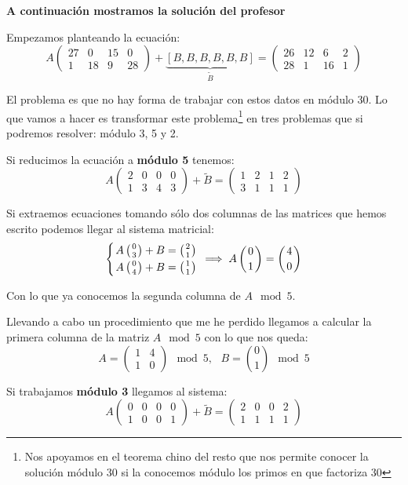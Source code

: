 \begin{problem}[6]
\textbf{A continuación mostramos la solución del profesor}

Empezamos planteando la ecuación:
\[A \left( \begin{array}{cccc}
		27 & 0 & 15 & 0\\
		1 & 18 & 9 & 28
	\end{array} \right) + \underbrace{[B,B,B,B,B,B]}_{\tilde{B}} = \left( \begin{array}{cccc}
		26 & 12 & 6 & 2\\
		28 & 1 & 16 & 1
	\end{array} \right)\]

El problema es que no hay forma de trabajar con estos datos en módulo 30. Lo que vamos a hacer es transformar este problema\footnote{Nos apoyamos en el teorema chino del resto que nos permite conocer la solución módulo 30 si la conocemos módulo los primos en que factoriza 30} en tres problemas que si podremos resolver: módulo 3, 5 y 2.

Si reducimos la ecuación a \textbf{módulo 5} tenemos:
\[A \left( \begin{array}{cccc}
		2 & 0 & 0 & 0\\
		1 & 3 & 4 & 3
	\end{array} \right) + \tilde{B} = \left( \begin{array}{cccc}
		1 & 2 & 1 & 2\\
		3 & 1 & 1 & 1
	\end{array} \right)\]


Si extraemos ecuaciones tomando sólo dos columnas de las matrices que hemos escrito podemos llegar al sistema matricial:
\[\left\{ A \left( 0 \atop 3\right) + B = \left(  2 \atop 1\right) \atop
A \left(  0 \atop 4\right) + B = \left( 1 \atop 1\right) \right. \implies A\left( 0 \atop 1\right) = \left( 4 \atop 0\right)\]

Con lo que ya conocemos la segunda columna de $A \mod 5$.

Llevando a cabo un procedimiento que me he perdido llegamos a calcular la primera columna de la matriz $A \mod 5$ con lo que nos queda:
\[A = \left( \begin{array}{cc} 1 & 4 \\ 1 & 0 \end{array}\right) \mod 5 , \ \ \ B={0 \choose 1} \mod 5\]

Si trabajamos \textbf{módulo 3} llegamos al sistema:
\[A \left( \begin{array}{cccc}
		0 & 0 & 0 & 0\\
		1 & 0 & 0 & 1
	\end{array} \right) + \tilde{B} = \left( \begin{array}{cccc}
		2 & 0 & 0 & 2\\
		1 & 1 & 1 & 1
	\end{array} \right)\]


\end{problem}
